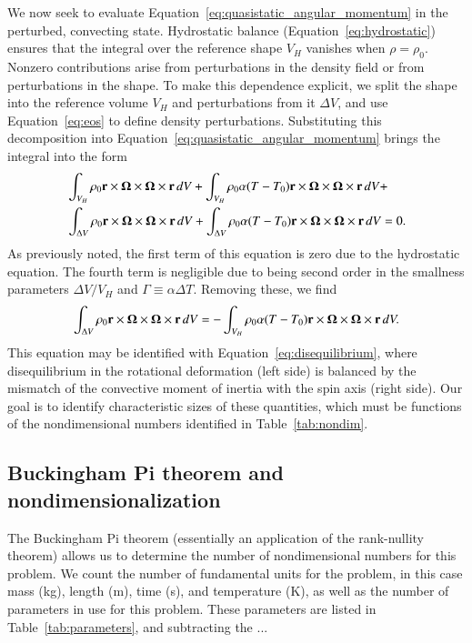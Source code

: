 \documentclass[preprint,12pt,authoryear]{elsarticle}
\newcommand{\mitbf}[1]{\hbox{\mathversion{bold}$#1$}}
\newif\ifdetail
\begin{document}
We now seek to evaluate Equation~\eqref{eq:quasistatic_angular_momentum} in the perturbed, convecting state.
Hydrostatic balance (Equation~\eqref{eq:hydrostatic}) ensures that the integral over the reference shape $V_H$ vanishes when $\rho = \rho_0$.
Nonzero contributions arise from perturbations in the density field or from perturbations in the shape.
To make this dependence explicit, we split the shape into the reference volume $V_H$ and perturbations from it $\Delta V$,
and use Equation~\eqref{eq:eos} to define density perturbations.
Substituting this decomposition into Equation~\eqref{eq:quasistatic_angular_momentum} brings the integral into the form
\begin{equation}
\begin{aligned}
&\int_{V_H} \rho_0 \mathbf{r} \times \mitbf{\Omega} \times \mitbf{\Omega} \times \mathbf{r} \,dV + 
\int_{V_H} \rho_0 \alpha (T-T_0) \mathbf{r} \times \mitbf{\Omega} \times \mitbf{\Omega} \times \mathbf{r} \,dV +  \\
&\int_{\Delta V} \rho_0 \mathbf{r} \times \mitbf{\Omega} \times \mitbf{\Omega} \times \mathbf{r} \,dV + 
\int_{\Delta V} \rho_0 \alpha (T-T_0) \mathbf{r} \times \mitbf{\Omega} \times \mitbf{\Omega} \times \mathbf{r} \,dV = 0.  \\
\end{aligned}
\end{equation}
As previously noted, the first term of this equation is zero due to the hydrostatic equation.  
The fourth term is negligible due to being second order in the smallness parameters $\Delta V/V_H$ and $\Gamma\equiv \alpha \Delta T$.
Removing these, we find
\begin{equation}
\begin{aligned}
\int_{\Delta V} \rho_0 \mathbf{r} \times \mitbf{\Omega} \times \mitbf{\Omega} \times \mathbf{r} \,dV = 
-\int_{V_H} \rho_0 \alpha (T-T_0) \mathbf{r} \times \mitbf{\Omega} \times \mitbf{\Omega} \times \mathbf{r} \,dV.
\end{aligned}
\end{equation}
This equation may be identified with Equation~\eqref{eq:disequilibrium}, 
where disequilibrium in the rotational deformation (left side) is balanced by the mismatch of the convective moment of inertia with the spin axis (right side).
Our goal is to identify characteristic sizes of these quantities, which must be functions of the nondimensional numbers identified in Table~\ref{tab:nondim}.

\ifdetail
\subsection{Buckingham Pi theorem and nondimensionalization}
\label{sec:buckingham}
The Buckingham Pi theorem (essentially an application of the rank-nullity theorem) allows us to determine the number of nondimensional numbers for this problem.
We count the number of fundamental units for the problem, in this case mass (kg), length (m), time (s), and temperature (K), as well as the number of parameters in use for this problem.  
These parameters are listed in Table~\ref{tab:parameters}, and subtracting the ...
\end{document}
